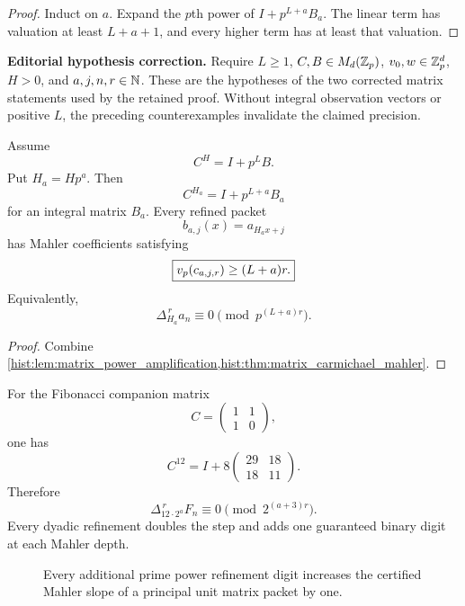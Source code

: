 \begin{proof}
Induct on \(a\). Expand the \(p\)th power of \(I+p^{L+a}B_a\). The linear term has valuation at least \(L+a+1\), and every higher term has at least that valuation.
\end{proof}

\begin{histtheorem}\label{hist:thm:matrix_polyphase_precision}
\par\noindent\textbf{Editorial hypothesis correction.} Require $L\ge1$, $C,B\in M_d(\mathbb Z_p)$, $v_0,w\in\mathbb Z_p^d$, $H>0$, and $a,j,n,r\in\mathbb N$. These are the hypotheses of the two corrected matrix statements used by the retained proof. Without integral observation vectors or positive $L$, the preceding counterexamples invalidate the claimed precision.\par\medskip
Assume
\[
C^H=I+p^LB.
\]
Put \(H_a=Hp^a\). Then
\[
C^{H_a}=I+p^{L+a}B_a
\]
for an integral matrix \(B_a\). Every refined packet
\[
b_{a,j}(x)=a_{H_ax+j}
\]
has Mahler coefficients satisfying
\[
\boxed{v_p(c_{a,j,r})\geq(L+a)r.}
\]
Equivalently,
\[
\boxed{
\Delta_{H_a}^{\,r}a_n
\equiv0
\pmod {p^{(L+a)r}}.
}
\]
\end{histtheorem}

\begin{proof}
Combine \cref{hist:lem:matrix_power_amplification,hist:thm:matrix_carmichael_mahler}.
\end{proof}

\begin{histexample}\label{hist:ex:refined_fibonacci_ladder}
For the Fibonacci companion matrix
\[
C=
\begin{pmatrix}
1&1\\
1&0
\end{pmatrix},
\]
one has
\[
C^{12}
=I+8
\begin{pmatrix}
29&18\\
18&11
\end{pmatrix}.
\]
Therefore
\[
\boxed{
\Delta_{12\cdot2^a}^{\,r}F_n
\equiv0
\pmod {2^{(a+3)r}}.
}
\]
Every dyadic refinement doubles the step and adds one guaranteed binary digit at each Mahler depth.
\end{histexample}

\begin{figure}[t]
\centering
{}
\caption{Every additional prime power refinement digit increases the certified Mahler slope of a principal unit matrix packet by one.}
\label{hist:fig:polyphase_precision_tree}
\end{figure}

